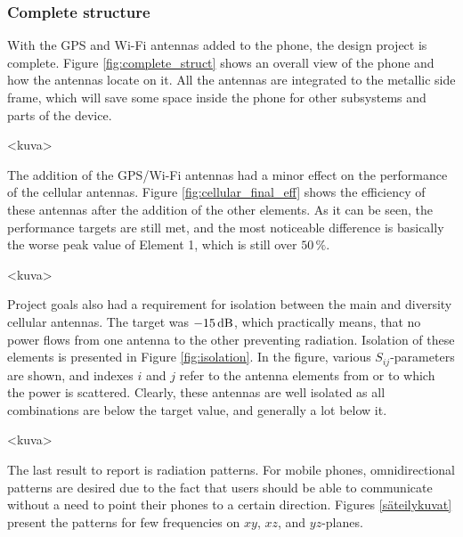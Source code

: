 \subsubsection{Complete structure}
\label{sec:complete_structure}
With the GPS and Wi-Fi antennas added to the phone, the design project is complete. Figure \ref{fig:complete_struct} shows an overall view of the phone and how the antennas locate on it. All the antennas are integrated to the metallic side frame, which will save some space inside the phone for other subsystems and parts of the device.

<kuva>

The addition of the GPS/Wi-Fi antennas had a minor effect on the performance of the cellular antennas. Figure \ref{fig:cellular_final_eff} shows the efficiency of these antennas after the addition of the other elements. As it can be seen, the performance targets are still met, and the most noticeable difference is basically the worse peak value of Element 1, which is still over $50\,\%$.

<kuva>

Project goals also had a requirement for isolation between the main and diversity cellular antennas. The target was $-15\,\mathrm{dB}$, which practically means, that no power flows from one antenna to the other preventing radiation. Isolation of these elements is presented in Figure \ref{fig:isolation}. In the figure, various $S_{ij}$-parameters are shown, and indexes $i$ and $j$ refer to the antenna elements from or to which the power is scattered. Clearly, these antennas are well isolated as all combinations are below the target value, and generally a lot below it.

<kuva>

The last result to report is radiation patterns. For mobile phones, omnidirectional patterns are desired due to the fact that users should be able to communicate without a need to point their phones to a certain direction. Figures \ref{säteilykuvat} present the patterns for few frequencies on $xy$, $xz$, and $yz$-planes.

\clearpage